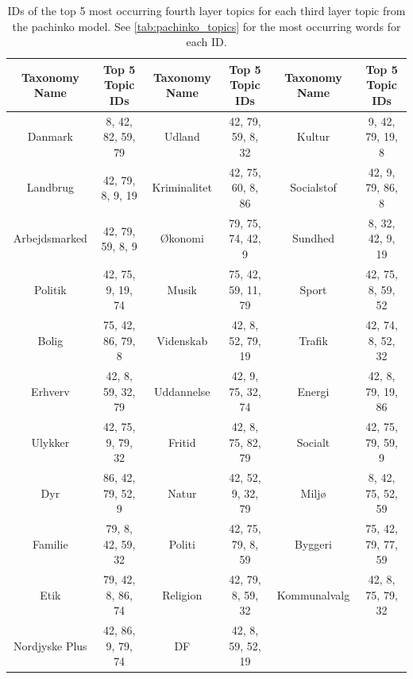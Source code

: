 \begin{table}[h]
	\centering
	\caption{IDs of the top 5 most occurring fourth layer topics for each third layer topic from the pachinko model. See \autoref{tab:pachinko_topics} for the most occurring words for each ID.}
	\label{tab:pachinko_mid_topics}
	\begin{tabular}{c | c | c | c | c | c}
		Taxonomy Name & Top 5 Topic IDs & Taxonomy Name & Top 5 Topic IDs & Taxonomy Name & Top 5 Topic IDs \\ \hline
		Danmark & 8, 42, 82, 59, 79 & Udland & 42, 79, 59, 8, 32 & Kultur & 9, 42, 79, 19, 8 \\
		Landbrug & 42, 79, 8, 9, 19 & Kriminalitet & 42, 75, 60, 8, 86 & Socialstof & 42, 9, 79, 86, 8 \\
		Arbejdsmarked & 42, 79, 59, 8, 9 & Økonomi & 79, 75, 74, 42, 9 & Sundhed & 8, 32, 42, 9, 19 \\
		Politik & 42, 75, 9, 19, 74 & Musik & 75, 42, 59, 11, 79 & Sport & 42, 75, 8, 59, 52 \\
		Bolig & 75, 42, 86, 79, 8 & Videnskab & 42, 8, 52, 79, 19 & Trafik & 42, 74, 8, 52, 32 \\
		Erhverv & 42, 8, 59, 32, 79 & Uddannelse & 42, 9, 75, 32, 74 & Energi & 42, 8, 79, 19, 86 \\
		Ulykker & 42, 75, 9, 79, 32 & Fritid & 42, 8, 75, 82, 79 & Socialt & 42, 75, 79, 59, 9 \\
		Dyr & 86, 42, 79, 52, 9 & Natur & 42, 52, 9, 32, 79 & Miljø & 8, 42, 75, 52, 59 \\
		Familie & 79, 8, 42, 59, 32 & Politi & 42, 75, 79, 8, 59 & Byggeri & 75, 42, 79, 77, 59 \\
		Etik & 79, 42, 8, 86, 74 & Religion & 42, 79, 8, 59, 32 & Kommunalvalg & 42, 8, 75, 79, 32 \\
		Nordjyske Plus & 42, 86, 9, 79, 74 & DF & 42, 8, 59, 52, 19 & & \\
	\end{tabular}
\end{table}